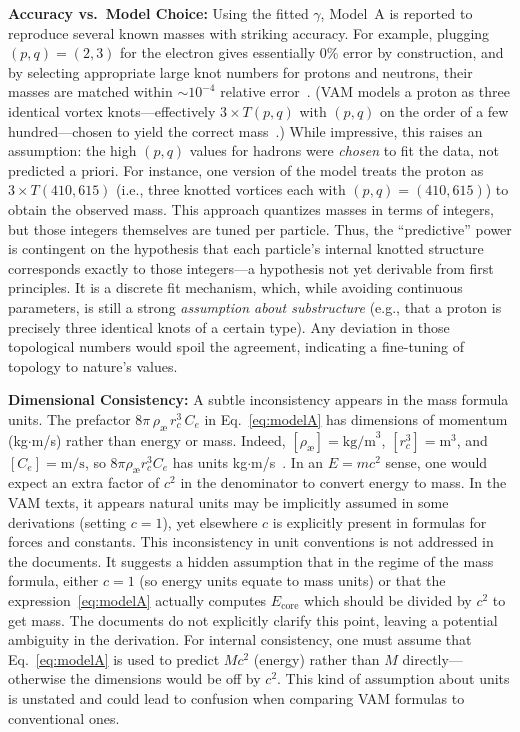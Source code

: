 \documentclass[a4paper,12pt]{article}
\begin{document}
    \textbf{Accuracy vs.\ Model Choice:} Using the fitted $\gamma$, Model~A is reported to reproduce several known masses with striking accuracy. For example, plugging $(p,q)=(2,3)$ for the electron gives essentially 0\% error by construction, and by selecting appropriate large knot numbers for protons and neutrons, their masses are matched within $\sim10^{-4}$ relative error~\cite{vamfit}. (VAM models a proton as three identical vortex knots---effectively $3\times T(p,q)$ with $(p,q)$ on the order of a few hundred---chosen to yield the correct mass~\cite{vamfit}.) While impressive, this raises an assumption: the high $(p,q)$ values for hadrons were \emph{chosen} to fit the data, not predicted a priori. For instance, one version of the model treats the proton as $3\times T(410,615)$ (i.e., three knotted vortices each with $(p,q)=(410,615)$) to obtain the observed mass. This approach quantizes masses in terms of integers, but those integers themselves are tuned per particle. Thus, the ``predictive'' power is contingent on the hypothesis that each particle’s internal knotted structure corresponds exactly to those integers---a hypothesis not yet derivable from first principles. It is a discrete fit mechanism, which, while avoiding continuous parameters, is still a strong \emph{assumption about substructure} (e.g., that a proton is precisely three identical knots of a certain type). Any deviation in those topological numbers would spoil the agreement, indicating a fine-tuning of topology to nature’s values.

    \textbf{Dimensional Consistency:} A subtle inconsistency appears in the mass formula units. The prefactor $8\pi\,\rho_{\text{\ae}}\,r_c^3\,C_e$ in Eq.~\eqref{eq:modelA} has dimensions of momentum (kg$\cdot$m/s) rather than energy or mass. Indeed, $[\rho_{\text{\ae}}]=\text{kg/m}^3$, $[r_c^3]=\text{m}^3$, and $[C_e]=\text{m/s}$, so $8\pi \rho_{\text{\ae}} r_c^3 C_e$ has units kg$\cdot$m/s~\cite{vamunits}. In an $E=mc^2$ sense, one would expect an extra factor of $c^2$ in the denominator to convert energy to mass. In the VAM texts, it appears natural units may be implicitly assumed in some derivations (setting $c=1$), yet elsewhere $c$ is explicitly present in formulas for forces and constants. This inconsistency in unit conventions is not addressed in the documents. It suggests a hidden assumption that in the regime of the mass formula, either $c=1$ (so energy units equate to mass units) or that the expression~\eqref{eq:modelA} actually computes $E_{\text{core}}$ which should be divided by $c^2$ to get mass. The documents do not explicitly clarify this point, leaving a potential ambiguity in the derivation. For internal consistency, one must assume that Eq.~\eqref{eq:modelA} is used to predict $M c^2$ (energy) rather than $M$ directly---otherwise the dimensions would be off by $c^2$. This kind of assumption about units is unstated and could lead to confusion when comparing VAM formulas to conventional ones.
\end{document}
